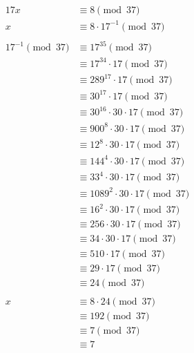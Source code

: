 \begin{solution}
\begin{align*}
17x &\equiv 8 \pmod{37} \\
x &\equiv 8 \cdot 17^{-1} \pmod{37} \\
\\
17^{-1} \pmod{37} &\equiv 17^{35} \pmod{37} \\
&\equiv 17^{34} \cdot 17 \pmod{37} \\
&\equiv 289^{17} \cdot 17 \pmod{37} \\
&\equiv 30^{17} \cdot 17 \pmod{37} \\
&\equiv 30^{16} \cdot 30 \cdot 17 \pmod{37} \\
&\equiv 900^{8} \cdot 30 \cdot 17 \pmod{37} \\
&\equiv 12^{8} \cdot 30 \cdot 17 \pmod{37} \\
&\equiv 144^{4} \cdot 30 \cdot 17 \pmod{37} \\
&\equiv 33^{4} \cdot 30 \cdot 17 \pmod{37} \\
&\equiv 1089^{2} \cdot 30 \cdot 17 \pmod{37} \\
&\equiv 16^{2} \cdot 30 \cdot 17 \pmod{37} \\
&\equiv 256 \cdot 30 \cdot 17 \pmod{37} \\
&\equiv 34 \cdot 30 \cdot 17 \pmod{37} \\
&\equiv 510 \cdot 17 \pmod{37} \\
&\equiv 29 \cdot 17 \pmod{37} \\
&\equiv 24 \pmod{37} \\
\\
x &\equiv 8 \cdot 24 \pmod{37} \\
&\equiv 192 \pmod{37} \\
&\equiv 7 \pmod{37} \\
&\equiv 7
\end{align*}

\end{solution}
